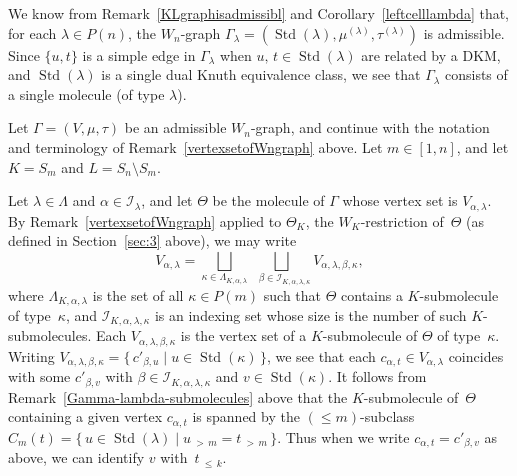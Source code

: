 \documentclass[ALCO,ThmDefs,Unicode,epreuves]{cedram}
\newcommand{\morethan}[2]{#1\,{_{>\,#2}}}
\newcommand{\Lessthan}[2]{#1\,{_{\leqslant\,#2}}}
\DeclareMathOperator{\STD}{Std}
\begin{document}
\begin{rema}\label{Gamma-lambdaIsAdmissible}
We know from Remark~\ref{KLgraphisadmissibl} and Corollary~\ref{leftcelllambda} that, for each
$\lambda\in P(n)$, the $W_n$-graph $\Gamma_{\lambda}=(\STD(\lambda),\mu^{(\lambda)},\tau^{(\lambda)})$
is admissible. Since $\{u,t\}$ is a simple edge in $\Gamma_{\lambda}$
when $u,\, t\in\STD(\lambda)$ are related by a
DKM, and $\STD(\lambda)$ is a single dual Knuth equivalence class, we see that
$\Gamma_{\lambda}$ consists of a single molecule (of type $\lambda$).
\end{rema}

\begin{rema}\label{restrictionrem}
Let $\Gamma=(V,\mu,\tau)$ be an admissible $W_n$-graph, and continue
with the notation and terminology of Remark~\ref{vertexsetofWngraph}
above. Let $m\in [1,n]$, and let $K=S_m$ and $L=S_n\setminus S_m$.

Let $\lambda\in\Lambda$ and $\alpha\in\mathcal I_\lambda$, and let $\Theta$
be the molecule of $\Gamma$ whose vertex set is $V_{\alpha,\lambda}$.
By Remark~\ref{vertexsetofWngraph} applied to $\Theta_K$, the $W_K$-restriction
of~$\Theta$ (as defined in Section~\ref{sec:3} above), we may write
\[
V_{\alpha,\lambda}=\bigsqcup_{\kappa\in\Lambda_{K,\alpha,\lambda}}
\bigsqcup_{\,\,\,\,\beta\in\mathcal{I}_{K,\alpha,\lambda,\kappa}\!\!\!\!}\!\!V_{\alpha,\lambda,\beta,\kappa},
\]
where $\Lambda_{K,\alpha,\lambda}$ is the set of all $\kappa\in P(m)$ such that
$\Theta$ contains a $K$-submolecule of type~$\kappa$, and
$\mathcal I_{K,\alpha,\lambda,\kappa}$ is an indexing set whose size is
the number of such $K$-submolecules. Each $V_{\alpha,\lambda,\beta,\kappa}$
is the vertex set of a $K$-submolecule of $\Theta$ of type~$\kappa$. Writing
$V_{\alpha,\lambda,\beta,\kappa}=\{\,c'_{\beta,u}\mid u\in\STD(\kappa)\,\}$,
we see that each $c_{\alpha,t}\in V_{\alpha,\lambda}$ coincides with some
$c'_{\beta,v}$ with $\beta\in\mathcal I_{K,\alpha,\lambda,\kappa}$ and
$v\in\STD(\kappa)$.
It follows from Remark~\ref{Gamma-lambda-submolecules} above that the
$K$-submolecule of~$\Theta$ containing a given vertex $c_{\alpha,t}$ is
spanned by the
$(\leqslant m)$-subclass~$C_m(t)=\{\,u\in\STD(\lambda)\mid\morethan um=\morethan tm\,\}$.
Thus when we write $c_{\alpha,t}=c'_{\beta,v}$ as above, we can identify
$v$ with~$\Lessthan tk$.


\end{rema}
\end{document}
